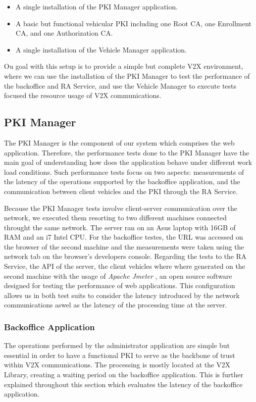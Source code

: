 \begin{itemize}
	\item A single installation of the PKI Manager application. 
	\item A basic but functional vehicular PKI including one Root CA, one Enrollment CA, and one Authorization CA.
	\item A single installation of the Vehicle Manager application. 	
\end{itemize}
Ou goal with this setup is to provide a simple but complete V2X environment, where we can use the installation of the PKI Manager to test the performance of the backoffice and RA Service, and use the Vehicle Manager to execute tests focused the resource usage of V2X communications. 

\subsection{PKI Manager}
The PKI Manager is the component of our system which comprises the web application. Therefore, the performance tests done to the PKI Manager have the main goal of understanding how does the application behave under different work load conditions. Such performance tests focus on two aspects: measurements of the latency of the operations supported by the backoffice application, and the communication between client vehicles and the PKI through the RA Service.

Because the PKI Manager tests involve client-server communication over the network, we executed them resorting to two different machines connected throught the same network. The server ran on an Asus laptop with 16GB of RAM and an i7 Intel CPU. For the backoffice testes, the URL was accessed on the browser of the second machine and the measurements were taken using the network tab on the browser's developers console. Regarding the tests to the RA Service, the API of the server, the client vehicles where where generated on the second machine with the usage of \textit{Apache Jmeter} \cite{jmeter}, an open source software designed for testing the performance of web applications. This configuration allows us in both test suits to consider the latency introduced by the network communications aswel as the latency of the processing time at the server. 


\subsubsection{Backoffice Application}
The operations performed by the administrator application are simple but essential in order to have a functional PKI to serve as the backbone of trust within V2X communications. The processing is mostly located at the V2X Library, creating a waiting period on the backoffice application. This is further explained throughout this section which evaluates the latency of the backoffice application.

